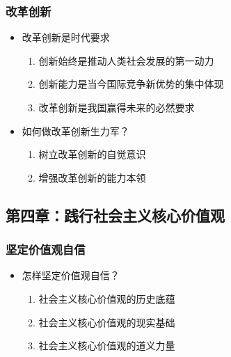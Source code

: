 \hypertarget{ux6539ux9769ux521bux65b0}{%
\subsubsection{改革创新}\label{ux6539ux9769ux521bux65b0}}

\begin{itemize}
\tightlist
\item
  改革创新是时代要求

  \begin{enumerate}
  \def\labelenumi{\arabic{enumi}.}
  \tightlist
  \item
    创新始终是推动人类社会发展的第一动力
  \item
    创新能力是当今国际竞争新优势的集中体现
  \item
    改革创新是我国赢得未来的必然要求
  \end{enumerate}
\item
  如何做改革创新生力军？

  \begin{enumerate}
  \def\labelenumi{\arabic{enumi}.}
  \tightlist
  \item
    树立改革创新的自觉意识
  \item
    增强改革创新的能力本领
  \end{enumerate}
\end{itemize}

\hypertarget{ux7b2cux56dbux7ae0ux8df5ux884cux793eux4f1aux4e3bux4e49ux6838ux5fc3ux4ef7ux503cux89c2}{%
\subsection{第四章：践行社会主义核心价值观}\label{ux7b2cux56dbux7ae0ux8df5ux884cux793eux4f1aux4e3bux4e49ux6838ux5fc3ux4ef7ux503cux89c2}}

\hypertarget{ux575aux5b9aux4ef7ux503cux89c2ux81eaux4fe1}{%
\subsubsection{坚定价值观自信}\label{ux575aux5b9aux4ef7ux503cux89c2ux81eaux4fe1}}

\begin{itemize}
\tightlist
\item
  怎样坚定价值观自信？

  \begin{enumerate}
  \def\labelenumi{\arabic{enumi}.}
  \tightlist
  \item
    社会主义核心价值观的历史底蕴
  \item
    社会主义核心价值观的现实基础
  \item
    社会主义核心价值观的道义力量
  \end{enumerate}
\end{itemize}

